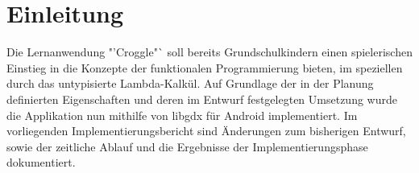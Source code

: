 \chapter{Einleitung}
Die Lernanwendung "'Croggle"` soll bereits Grundschulkindern einen spielerischen Einstieg in die Konzepte der funktionalen Programmierung bieten, im speziellen durch das untypisierte Lambda-Kalkül.
Auf Grundlage der in der Planung definierten Eigenschaften und deren im Entwurf festgelegten Umsetzung wurde die Applikation nun mithilfe von libgdx für Android implementiert.
Im vorliegenden Implementierungsbericht sind Änderungen zum bisherigen Entwurf, sowie der zeitliche Ablauf und die Ergebnisse der Implementierungsphase dokumentiert.

